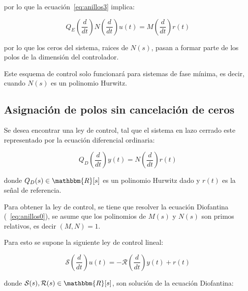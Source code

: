             por lo que la ecuación~\ref{eq:anillos3} implica:

            \begin{equation}
                Q_E \left( \frac{d}{dt} \right) N \left( \frac{d}{dt} \right) u(t) = M \left( \frac{d}{dt} \right) r(t)
            \end{equation}

            por lo que los ceros del sistema, raices de $N(s)$, pasan a formar parte de los polos de la dimensión del controlador.

            Este esquema de control solo funcionará para sistemas de fase mínima, es decir, cuando $N(s)$ es un polinomio Hurwitz.


        \subsection{Asignación de polos sin cancelación de ceros}

            \begin{problema}
                Se desea encontrar una ley de control, tal que el sistema en lazo cerrado este representado por la ecuación diferencial ordinaria:

                \begin{equation}
                    Q_D \left( \frac{d}{dt} \right) y(t) = N \left( \frac{d}{dt} \right) r(t)
                \end{equation}

                donde $Q_D(s) \in \mathbbm{R}[s]$ es un polinomio Hurwitz dado y $r(t)$ es la señal de referencia.
            \end{problema}

            Para obtener la ley de control, se tiene que resolver la ecuación Diofantina (~\ref{eq:anillos0}), se asume que los polinomios de $M(s)$ y $N(s)$ son primos relativos, es decir $(M, N) = 1$.

            Para esto se supone la siguiente ley de control lineal:

            \begin{equation} \label{eq:anillos4}
                \mathcal{S} \left( \frac{d}{dt} \right) u(t) = - \mathcal{R} \left( \frac{d}{dt} \right) y(t) + r(t)
            \end{equation}

            donde $\mathcal{S}(s), \mathcal{R}(s) \in \mathbbm{R}[s]$, son solución de la ecuación Diofantina:

